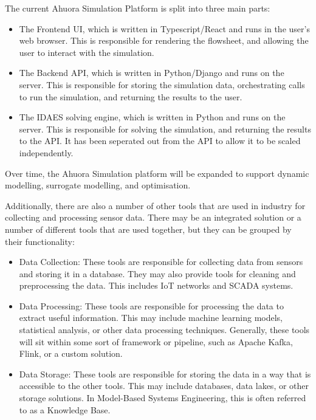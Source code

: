 \documentclass[12pt]{report}
\begin{document}
The current Ahuora Simulation Platform is split into three main parts:

\begin{itemize}
    \item The Frontend UI, which is written in Typescript/React and runs in the user's web browser. This is responsible for rendering the flowsheet, and allowing the user to interact with the simulation.
    \item The Backend API, which is written in Python/Django and runs on the server. This is responsible for storing the simulation data, orchestrating calls to run the simulation, and returning the results to the user.
    \item The IDAES solving engine, which is written in Python and runs on the server. This is responsible for solving the simulation, and returning the results to the API. It has been seperated out from the API to allow it to be scaled independently.
\end{itemize}

Over time, the Ahuora Simulation platform will be expanded to support dynamic modelling, surrogate modelling, and optimisation.

Additionally, there are also a number of other tools that are used in industry for collecting and processing sensor data. There may be an integrated solution or a number of different tools that are used together, but they can be grouped by their functionality:
\begin{itemize}
    \item Data Collection: These tools are responsible for collecting data from sensors and storing it in a database. They may also provide tools for cleaning and preprocessing the data. This includes IoT networks and SCADA systems.
    \item Data Processing: These tools are responsible for processing the data to extract useful information. This may include machine learning models, statistical analysis, or other data processing techniques. Generally, these tools will sit within some sort of framework or pipeline, such as Apache Kafka, Flink, or a custom solution.
    \item Data Storage: These tools are responsible for storing the data in a way that is accessible to the other tools. This may include databases, data lakes, or other storage solutions. In Model-Based Systems Engineering, this is often referred to as a Knowledge Base.
\end{itemize}
\end{document}
